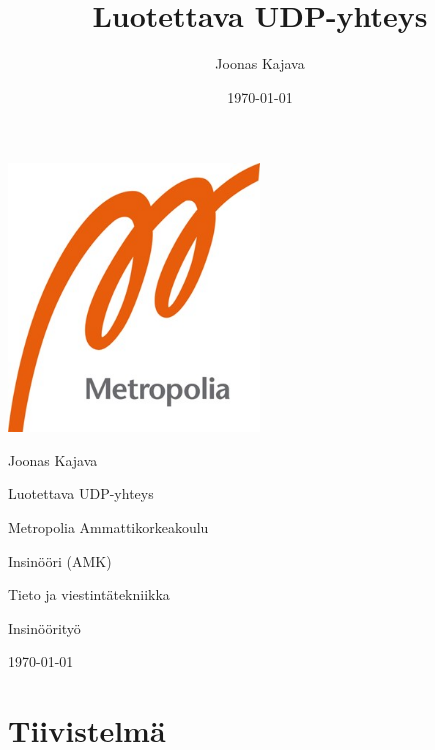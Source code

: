 \documentclass[a4paper,12pt]{article}
\title{Luotettava UDP-yhteys}
\author{Joonas Kajava}
\date{\today}
\newcommand{\me}{Joonas Kajava}
\renewcommand{\title}{Luotettava UDP-yhteys}
\begin{document}
    \begin{titlepage}
    
        \pagestyle{empty}
        
        \includegraphics[width=0.5\textwidth]{images/metropolia}\par\vspace{2cm}
        {\Large \me}\par \vspace{1cm}

        {\Huge \title}\par \vspace{1cm}

        \vfill

        Metropolia Ammattikorkeakoulu\par
        Insinööri (AMK)\par
        Tieto ja viestintätekniikka\par
        Insinöörityö\par
        \today

        \newpage

        \section*{Tiivistelmä}


\end{titlepage}
\end{document}
